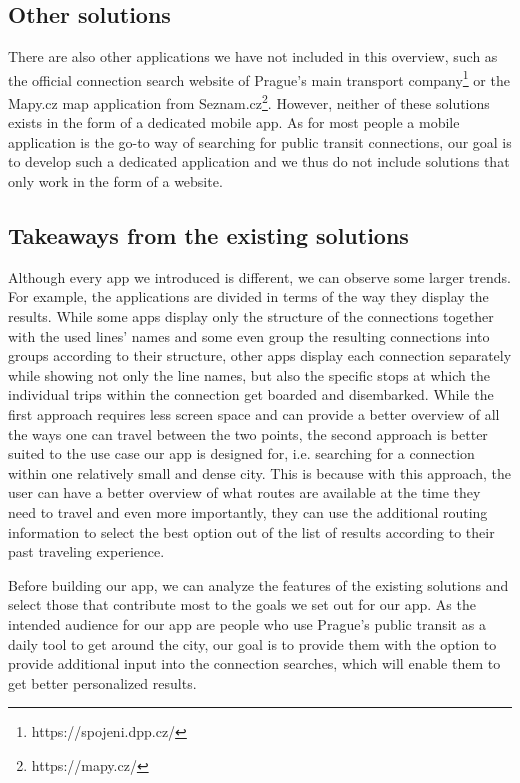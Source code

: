 \subsection{Other solutions}

There are also other applications we have not included in this overview, such as the official connection search website of Prague's main transport company\footnote{https://spojeni.dpp.cz/} or the Mapy.cz map application from Seznam.cz\footnote{https://mapy.cz/}. However, neither of these solutions exists in the form of a dedicated mobile app. As for most people a mobile application is the go-to way of searching for public transit connections, our goal is to develop such a dedicated application and we thus do not include solutions that only work in the form of a website.

\subsection{Takeaways from the existing solutions}

Although every app we introduced is different, we can observe some larger trends. For example, the applications are divided in terms of the way they display the results. While some apps display only the structure of the connections together with the used lines' names and some even group the resulting connections into groups according to their structure, other apps display each connection separately while showing not only the line names, but also the specific stops at which the individual trips within the connection get boarded and disembarked. While the first approach requires less screen space and can provide a better overview of all the ways one can travel between the two points, the second approach is better suited to the use case our app is designed for, i.e. searching for a connection within one relatively small and dense city. This is because with this approach, the user can have a better overview of what routes are available at the time they need to travel and even more importantly, they can use the additional routing information to select the best option out of the list of results according to their past traveling experience.



Before building our app, we can analyze the features of the existing solutions and select those that contribute most to the goals we set out for our app. As the intended audience for our app are people who use Prague's public transit as a daily tool to get around the city, our goal is to provide them with the option to provide additional input into the connection searches, which will enable them to get better personalized results.

